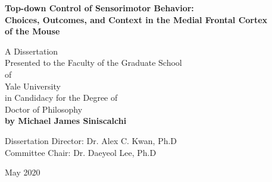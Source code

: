 
\begin{titlepage}
\centering
\singlespace

\vspace*{1in}
\textbf{
Top-down Control of Sensorimotor Behavior:\\
Choices, Outcomes, and Context in the Medial Frontal Cortex\\
of the Mouse
}
 
\vfill
A Dissertation\\Presented to the Faculty of the Graduate School\\of\\Yale University\\
in Candidacy for the Degree of\\Doctor of Philosophy\\

\vfill
\textbf{by Michael James Siniscalchi}

\vspace{0.5in}
Dissertation Director: Dr. Alex C. Kwan, Ph.D\\
Committee Chair: Dr. Daeyeol Lee, Ph.D

\vspace{0.5in}
May 2020
 
\vspace{1in}
\end{titlepage}